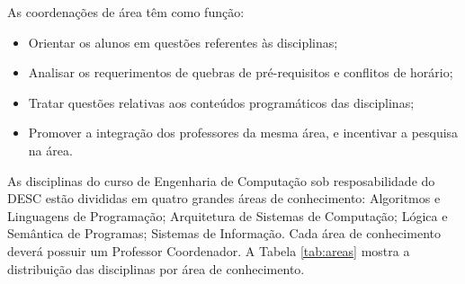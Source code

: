As coordenações de área têm como função:

\begin{itemize}
    \item Orientar os alunos em questões referentes às disciplinas;
    \item Analisar os requerimentos de quebras de pré-requisitos e conflitos de horário;
    \item Tratar questões relativas aos conteúdos programáticos das disciplinas;
    \item Promover a integração dos professores da mesma área, e incentivar a pesquisa na área.
\end{itemize}

As disciplinas do curso de Engenharia de Computação sob resposabilidade do DESC estão divididas em quatro grandes áreas de conhecimento: Algoritmos e Linguagens de Programação; Arquitetura de Sistemas de Computação; Lógica e Semântica de Programas; Sistemas de Informação. Cada área de conhecimento deverá possuir um Professor Coordenador. A Tabela \ref{tab:areas} mostra a distribuição das disciplinas por área de conhecimento.

